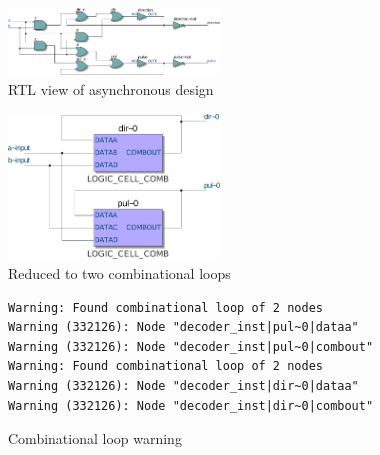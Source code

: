 \documentclass[a4paper]{article}
\begin{document}
\begin{figure}
\centering
\includegraphics[width=0.5\textwidth]{asynchronous_quadrature_decoder_quartus_rtl.pdf}
\caption{RTL view of asynchronous design}
\end{figure}
\begin{figure}
\centering
\includegraphics[width=0.5\textwidth]{asynchronous_quadrature_decoder_quartus_map.pdf}
\caption{Reduced to two combinational loops}
\end{figure}
\begin{figure}
\centering
\begin{BVerbatim}
Warning: Found combinational loop of 2 nodes
Warning (332126): Node "decoder_inst|pul~0|dataa"
Warning (332126): Node "decoder_inst|pul~0|combout"
Warning: Found combinational loop of 2 nodes
Warning (332126): Node "decoder_inst|dir~0|dataa"
Warning (332126): Node "decoder_inst|dir~0|combout"
\end{BVerbatim}
\caption{Combinational loop warning}
\end{figure}
\end{document}
